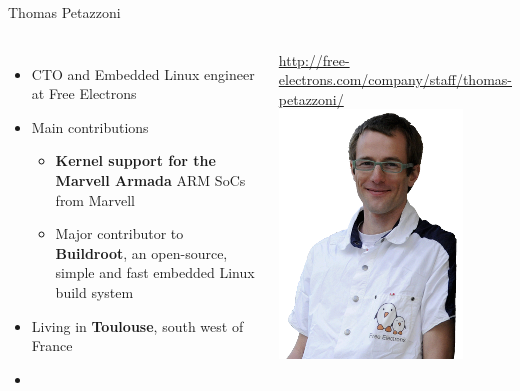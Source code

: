 \begin{frame}{Thomas Petazzoni}
 \begin{columns}
  \begin{itemize}
  \item CTO and Embedded Linux engineer at Free Electrons
  \item Main contributions
    \begin{itemize}
    \item {\bf Kernel support for the Marvell Armada} ARM SoCs from
      Marvell
    \item Major contributor to {\bf Buildroot}, an open-source, simple and
      fast embedded Linux build system
    \end{itemize}
  \item Living in {\bf Toulouse}, south west of France
  \item {}
  \end{itemize}
  \url{http://free-electrons.com/company/staff/thomas-petazzoni/}
    \includegraphics[width=\textwidth]{slides/first-slides/thomas-petazzoni.png}
 \end{columns}
\end{frame}

